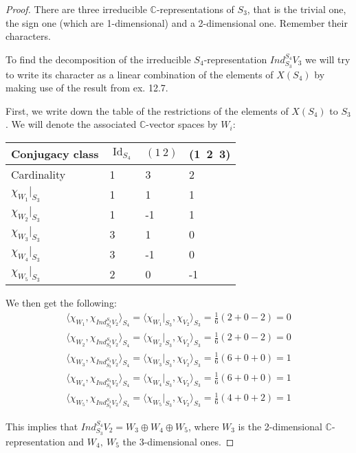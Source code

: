 \documentclass{article}
\newcommand{\numberset}{\mathbb}
\newcommand{\C}{\numberset{C}}
\DeclareMathOperator{\Id}{Id}
\begin{document}
\begin{proof}
    There are three irreducible $\C$-representations of $S_3$, that is the
    trivial one, the sign one (which are 1-dimensional) and a
    2-dimensional one. Remember their characters.

    To find the decomposition of the irreducible $S_4$-representation
    $Ind^{S_4}_{S_3}V_3$ we will try to write its character as a linear
    combination of the elements of $X(S_4)$ by making use of the result from ex.
    12.7.

    First, we write down the table of the restrictions of the elements of
    $X(S_4)$ to $S_3$. We will denote the associated $\C$-vector spaces by
    $W_i$:
    
    \begin{tabular}{l|l|l|l}
        Conjugacy class & $\Id_{S_4}$ & $(1\ 2)$ & (1\ 2\ 3) \\ \hline
        Cardinality & 1 & 3 & 2 \\ \hline
        $\chi_{W_1}|_{S_3}$ & 1 & 1 & 1 \\ \hline
        $\chi_{W_2}|_{S_3}$ & 1 & -1 & 1 \\ \hline
        $\chi_{W_3}|_{S_3}$ & 3 & 1 & 0 \\ \hline
        $\chi_{W_4}|_{S_3}$ & 3 & -1 & 0 \\ \hline
        $\chi_{W_5}|_{S_3}$ & 2 & 0 & -1
    \end{tabular}

    We then get the following:
    \begin{align*}
        \langle\chi_{W_1},\chi_{Ind^{S_4}_{S_3}V_2}\rangle_{S_4}=
        \langle\chi_{W_1}|_{S_3},\chi_{V_2}\rangle_{S_3}=\frac{1}{6}(2+0-2)=0 \\
        \langle\chi_{W_2},\chi_{Ind^{S_4}_{S_3}V_2}\rangle_{S_4}=
        \langle\chi_{W_2}|_{S_3},\chi_{V_2}\rangle_{S_3}=\frac{1}{6}(2+0-2)=0 \\
        \langle\chi_{W_3},\chi_{Ind^{S_4}_{S_3}V_2}\rangle_{S_4}=
        \langle\chi_{W_3}|_{S_3},\chi_{V_2}\rangle_{S_3}=\frac{1}{6}(6+0+0)=1 \\
        \langle\chi_{W_4},\chi_{Ind^{S_4}_{S_3}V_2}\rangle_{S_4}=
        \langle\chi_{W_4}|_{S_3},\chi_{V_2}\rangle_{S_3}=\frac{1}{6}(6+0+0)=1 \\
        \langle\chi_{W_5},\chi_{Ind^{S_4}_{S_3}V_2}\rangle_{S_4}=
        \langle\chi_{W_5}|_{S_3},\chi_{V_2}\rangle_{S_3}=\frac{1}{6}(4+0+2)=1
    \end{align*}

    This implies that $Ind^{S_4}_{S_3}V_2=W_3\oplus W_4\oplus W_5$, where $W_3$
    is the 2-dimensional $\C$-representation and $W_4,\ W_5$ the 3-dimensional
    ones.
\end{proof}


\printbibliography
\end{document}
